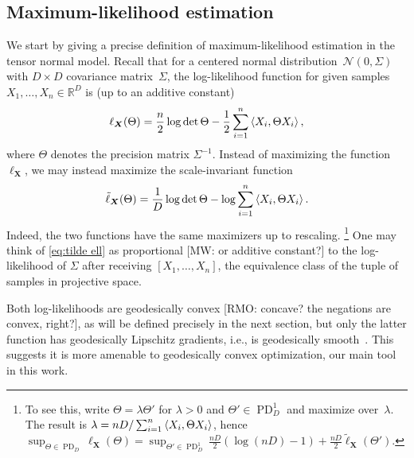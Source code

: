\documentclass{article}
\newcommand{\R}{{\mathbb{R}}}
\renewcommand{\vec}{\bm}
\newcommand\cN{\mathcal{N}}
\newcommand\PD{\operatorname{PD}}
\newcommand{\RMO}[1]{{\color{red}[RMO: #1]}}
\newcommand{\MW}[1]{{\color{red}[MW: #1]}}
\begin{document}
\subsection{Maximum-likelihood estimation}
We start by giving a precise definition of maximum-likelihood estimation in the tensor normal model.
Recall that for a centered normal distribution~$\cN(0,\Sigma)$ with $D\times D$ covariance matrix~$\Sigma$, the log-likelihood function for given samples $X_1,\dots,X_n\in\R^D$ is (up to an additive constant)
\begin{align*}
  \ell_{\vec X}(\Theta)
  = \frac n2 \log \det \Theta - \frac12 \sum_{i=1}^n \braket{X_i, \Theta X_i},
\end{align*}
where $\Theta$ denotes the precision matrix $\Sigma^{-1}$.
Instead of maximizing the function~$\ell_{\vec X}$, we may instead maximize the scale-invariant function
\begin{align}\label{eq:tilde ell}
  \tilde\ell_{\vec X}(\Theta) = \frac1D\log\det \Theta - \log \sum_{i=1}^n \braket{X_i, \Theta X_i}.
\end{align}
Indeed, the two functions have the same maximizers up to rescaling.%
\footnote{To see this, write $\Theta = \lambda \Theta'$ for $\lambda>0$ and $\Theta'\in\PD_D^1$ and maximize over~$\lambda$.
The result is $\lambda = n D / \sum_{i=1}^n \braket{X_i, \Theta X_i}$, hence $\sup_{\Theta\in\PD_D} \ell_{\vec X}(\Theta) = \sup_{\Theta'\in\PD_D^1} \frac {nD}2 \left( \log(nD) - 1 \right) + \frac{nD}2 \tilde\ell_{\vec X}(\Theta')$.}
One may think of \cref{eq:tilde ell} as proportional \MW{or additive constant?} to the log-likelihood of $\Sigma$ after receiving $[X_1, \dots, X_n]$, the equivalence class of the tuple of samples in projective space.


Both log-likelihoods are geodesically convex \RMO{concave? the negations are convex, right?}, as will be defined precisely in the next section, but only the latter function has geodesically Lipschitz gradients, i.e., is geodesically smooth~\cite{burgisser2019towards}.
This suggests it is more amenable to geodesically convex optimization, our main tool in this work.
\end{document}
